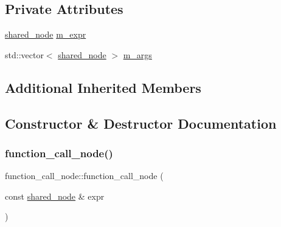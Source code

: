 \subsection*{Private Attributes}
\begin{DoxyCompactItemize}
\item 
\hyperlink{namespacejawe_a3f307481d921b6cbb50cc8511fc2b544}{shared\+\_\+node} \hyperlink{classjawe_1_1function__call__node_a5f27859d75f8f078a169afd6abf574ba}{m\+\_\+expr}
\item 
std\+::vector$<$ \hyperlink{namespacejawe_a3f307481d921b6cbb50cc8511fc2b544}{shared\+\_\+node} $>$ \hyperlink{classjawe_1_1function__call__node_aab5c174a179c885492cc929e6cebe2ee}{m\+\_\+args}
\end{DoxyCompactItemize}
\subsection*{Additional Inherited Members}


\subsection{Constructor \& Destructor Documentation}
\mbox{\label{classjawe_1_1function__call__node_a2c3a421053dc63b17efef188f4460c19}} 
\subsubsection{\texorpdfstring{function\+\_\+call\+\_\+node()}{function\_call\_node()}\hspace{0.1cm}{\footnotesize\ttfamily [1/2]}}
{\footnotesize\ttfamily function\+\_\+call\+\_\+node\+::function\+\_\+call\+\_\+node (\begin{DoxyParamCaption}\item[{const \hyperlink{namespacejawe_a3f307481d921b6cbb50cc8511fc2b544}{shared\+\_\+node} \&}]{expr }\end{DoxyParamCaption})}

\mbox{\label{classjawe_1_1function__call__node_afdec8b2a9ab5db923eac27653e50a5f7}} 
